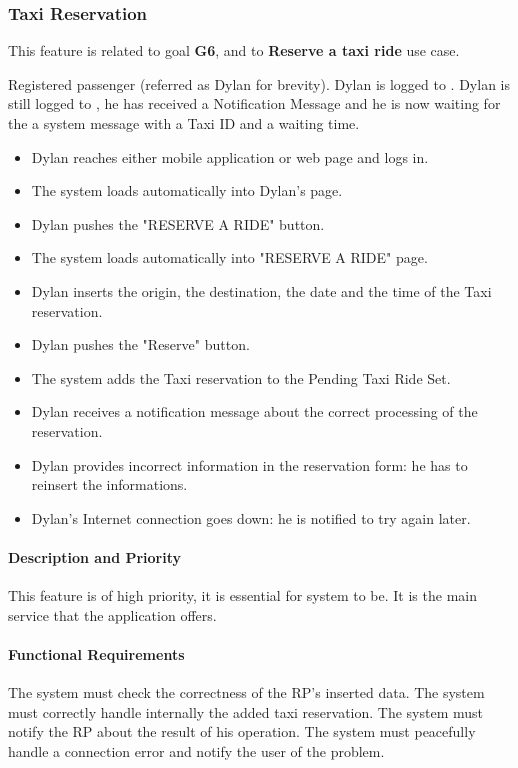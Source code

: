 \subsubsection{Taxi Reservation}
This feature is related to goal \textbf{G6}, and to \textbf{Reserve a taxi ride} use case.
\begin{itemize}
	 Registered passenger (referred as Dylan for brevity).
	 Dylan is logged to \myTaxiService{}.
	 Dylan is still logged to \myTaxiService{}, he has received a Notification Message and he is now waiting for the a system message with a Taxi ID and a waiting time.
	\begin{itemize}
		\item Dylan reaches either \myTaxiService{} mobile application or web page and logs in.
		\item The system loads automatically into Dylan's page.
		\item Dylan pushes the "RESERVE A RIDE" button.
		\item The system loads automatically into "RESERVE A RIDE" page.
		\item Dylan inserts the origin, the destination, the date and the time of the Taxi reservation.
		\item Dylan pushes the "Reserve" button.
		\item The system adds the Taxi reservation to the Pending Taxi Ride Set.
		\item Dylan receives a notification message about the correct processing of the reservation. 
	\end{itemize}
	\begin{itemize}
		\item Dylan provides incorrect information in the reservation form: he has to reinsert the informations.
		\item Dylan's Internet connection goes down: he is notified to try again later.  
	\end{itemize}
\end{itemize}
\paragraph{Description and Priority}
This feature is of high priority, it is essential for \myTaxiService{} system to be. It is the main service that the application offers.
\paragraph{Functional Requirements}
\begin{itemize}
	 The system must check the correctness of the RP's inserted data.
	 The system must correctly handle internally the added taxi reservation.
	 The system must notify the RP about the result of his operation.
	 The system must peacefully handle a connection error and notify the user of the problem.
\end{itemize}
